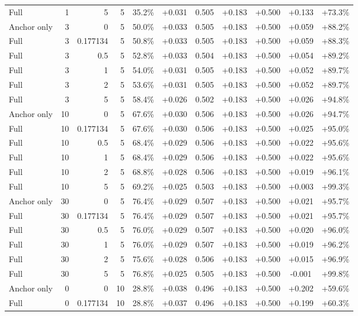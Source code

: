 \begin{table}[htbp]
\begin{tabular}{lrrrccccccc}
Full & 1 & 5 & 5 & 35.2\% & +0.031 & 0.505 & +0.183 & +0.500 & +0.133 & +73.3\% \\
Anchor only & 3 & 0 & 5 & 50.0\% & +0.033 & 0.505 & +0.183 & +0.500 & +0.059 & +88.2\% \\
Full & 3 & 0.177134 & 5 & 50.8\% & +0.033 & 0.505 & +0.183 & +0.500 & +0.059 & +88.3\% \\
Full & 3 & 0.5 & 5 & 52.8\% & +0.033 & 0.504 & +0.183 & +0.500 & +0.054 & +89.2\% \\
Full & 3 & 1 & 5 & 54.0\% & +0.031 & 0.505 & +0.183 & +0.500 & +0.052 & +89.7\% \\
Full & 3 & 2 & 5 & 53.6\% & +0.031 & 0.505 & +0.183 & +0.500 & +0.052 & +89.7\% \\
Full & 3 & 5 & 5 & 58.4\% & +0.026 & 0.502 & +0.183 & +0.500 & +0.026 & +94.8\% \\
Anchor only & 10 & 0 & 5 & 67.6\% & +0.030 & 0.506 & +0.183 & +0.500 & +0.026 & +94.7\% \\
Full & 10 & 0.177134 & 5 & 67.6\% & +0.030 & 0.506 & +0.183 & +0.500 & +0.025 & +95.0\% \\
Full & 10 & 0.5 & 5 & 68.4\% & +0.029 & 0.506 & +0.183 & +0.500 & +0.022 & +95.6\% \\
Full & 10 & 1 & 5 & 68.4\% & +0.029 & 0.506 & +0.183 & +0.500 & +0.022 & +95.6\% \\
Full & 10 & 2 & 5 & 68.8\% & +0.028 & 0.506 & +0.183 & +0.500 & +0.019 & +96.1\% \\
Full & 10 & 5 & 5 & 69.2\% & +0.025 & 0.503 & +0.183 & +0.500 & +0.003 & +99.3\% \\
Anchor only & 30 & 0 & 5 & 76.4\% & +0.029 & 0.507 & +0.183 & +0.500 & +0.021 & +95.7\% \\
Full & 30 & 0.177134 & 5 & 76.4\% & +0.029 & 0.507 & +0.183 & +0.500 & +0.021 & +95.7\% \\
Full & 30 & 0.5 & 5 & 76.0\% & +0.029 & 0.507 & +0.183 & +0.500 & +0.020 & +96.0\% \\
Full & 30 & 1 & 5 & 76.0\% & +0.029 & 0.507 & +0.183 & +0.500 & +0.019 & +96.2\% \\
Full & 30 & 2 & 5 & 75.6\% & +0.028 & 0.506 & +0.183 & +0.500 & +0.015 & +96.9\% \\
Full & 30 & 5 & 5 & 76.8\% & +0.025 & 0.505 & +0.183 & +0.500 & -0.001 & +99.8\% \\
Anchor only & 0 & 0 & 10 & 28.8\% & +0.038 & 0.496 & +0.183 & +0.500 & +0.202 & +59.6\% \\
Full & 0 & 0.177134 & 10 & 28.8\% & +0.037 & 0.496 & +0.183 & +0.500 & +0.199 & +60.3\% \\

\end{tabular}
\end{table}
